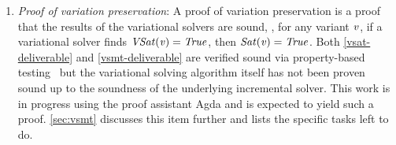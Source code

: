 \begin{enumerate}
\item \label{proof-deliverable} \textit{Proof of variation preservation}: A
  proof of variation preservation is a proof that the results of the variational
  solvers are sound, \ie{}, for any variant $\mathit{v}$, if a variational solver
  finds $\mathit{VSat(v)} = \mathit{True}$, then $\mathit{Sat(v)} = \mathit{True}$. Both
  \autoref{vsat-deliverable} and \autoref{vsmt-deliverable} are verified sound
  via property-based testing~\cite{10.1145/351240.351266} but the variational
  solving algorithm itself has not been proven sound up to the soundness of the
  underlying incremental solver. This work is in progress using the proof
  assistant Agda\cite{10.1145/2841316} and is expected to yield such a proof.
  \autoref{sec:vsmt} discusses this item further and lists the specific tasks
  left to do.
\end{enumerate}


